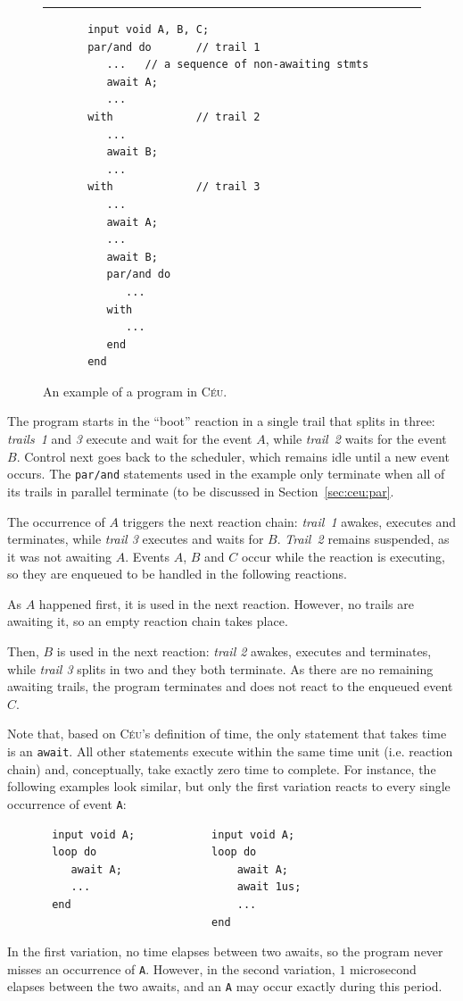 \documentclass[11pt,a4paper]{article}
\newcommand{\2}{\;\;}
\newcommand{\5}{\;\;\;\;\;}
\newcommand{\CEU}{\textsc{C\'{e}u}}
\newcommand{\code}[1] {{\small{\texttt{#1}}}}
\begin{document}
\begin{figure}[h]
\rule{15cm}{0.37pt}
{\small
\begin{verbatim}
       input void A, B, C;
       par/and do       // trail 1
          ...   // a sequence of non-awaiting stmts
          await A;
          ...
       with             // trail 2
          ...
          await B;
          ...
       with             // trail 3
          ...
          await A;
          ...
          await B;
          par/and do
             ...
          with
             ...
          end
       end
\end{verbatim}
}
\caption{ An example of a program in \CEU{}.
\label{lst:ceu:2}
}
\end{figure}
The program starts in the ``boot'' reaction in a single trail that splits in 
three: \emph{trails~1} and \emph{3} execute and wait for the event $A$, while 
\emph{trail~2} waits for the event $B$.
Control next goes back to the scheduler, which remains idle until a new event 
occurs.
The \code{par/and} statements used in the example only terminate when all of 
its trails in parallel terminate (to be discussed in Section~\ref{sec:ceu:par}.

The occurrence of $A$ triggers the next reaction chain: \emph{trail~1} awakes, 
executes and terminates, while \emph{trail 3} executes and waits for $B$.
\emph{Trail~2} remains suspended, as it was not awaiting $A$.
Events $A$, $B$ and $C$ occur while the reaction is executing, so they are 
enqueued to be handled in the following reactions.

As $A$ happened first, it is used in the next reaction.
However, no trails are awaiting it, so an empty reaction chain takes place.

Then, $B$ is used in the next reaction: \emph{trail 2} awakes, executes and 
terminates, while \emph{trail 3} splits in two and they both terminate.
As there are no remaining awaiting trails, the program terminates and does not 
react to the enqueued event $C$.

Note that, based on \CEU's definition of time, the only statement that takes 
time is an \code{await}.
All other statements execute within the same time unit (i.e. reaction chain) 
and, conceptually, take exactly zero time to complete.
For instance, the following examples look similar, but only the first variation 
reacts to every single occurrence of event \code{A}:
{\small
\begin{verbatim}
       input void A;            input void A;
       loop do                  loop do
          await A;                  await A;
          ...                       await 1us;
       end                          ...
                                end
\end{verbatim}
}
In the first variation, no time elapses between two awaits, so the program 
never misses an occurrence of \code{A}.
However, in the second variation, $1$ microsecond elapses between the two 
awaits, and an \code{A} may occur exactly during this period.
\end{document}
